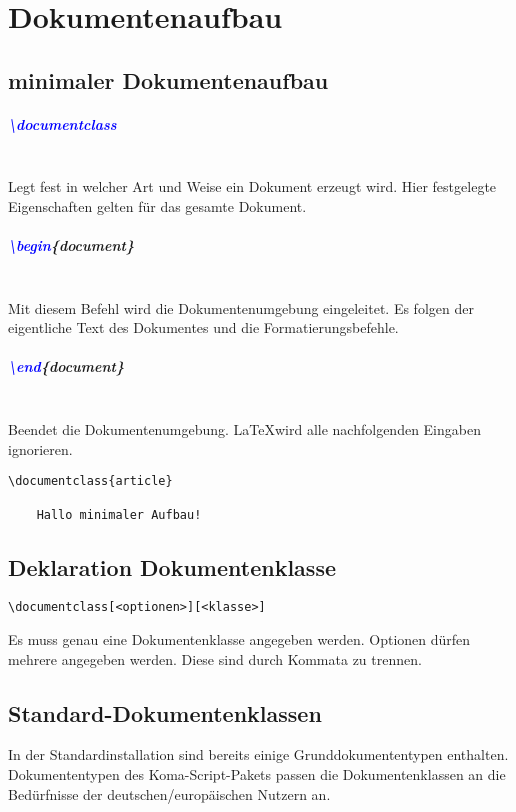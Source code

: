 \chapter{Dokumentenaufbau}
\section{minimaler Dokumentenaufbau}
\paragraph{\textcolor{blue}{\textbackslash documentclass}}\leavevmode \\
Legt fest in welcher Art und Weise ein Dokument erzeugt wird. Hier festgelegte Eigenschaften gelten für das gesamte Dokument.
\paragraph{\textcolor{blue}{\textbackslash begin}\{document\}}\leavevmode \\
Mit diesem Befehl wird die Dokumentenumgebung eingeleitet. Es folgen der eigentliche Text des Dokumentes und die Formatierungsbefehle.
\paragraph{\textcolor{blue}{\textbackslash end}\{document\}}\leavevmode \\
Beendet die Dokumentenumgebung. \LaTeX wird alle nachfolgenden Eingaben ignorieren.
\begin{lstlisting}[caption={Minimaler Dokumentenaufbau}]
\documentclass{article}

	Hallo minimaler Aufbau!

\end{lstlisting}
\section{Deklaration Dokumentenklasse}
\begin{verbatim}
\documentclass[<optionen>][<klasse>]
\end{verbatim}
Es muss genau eine Dokumentenklasse angegeben werden. Optionen dürfen mehrere angegeben werden. Diese sind durch Kommata zu trennen.
\section{Standard-Dokumentenklassen}
In der Standardinstallation sind bereits einige Grunddokumententypen enthalten. Dokumententypen des Koma-Script-Pakets passen die Dokumentenklassen an die Bedürfnisse der deutschen/europäischen Nutzern an.
